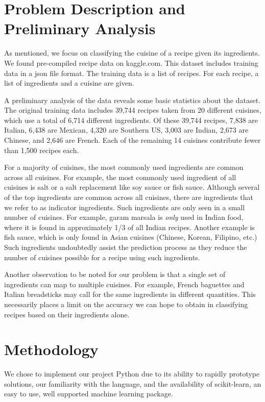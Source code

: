 \documentclass[11pt]{article}
\begin{document}
\section{Problem Description and Preliminary Analysis}
As mentioned, we focus on classifying the cuisine of a recipe given
its ingredients.  We found pre-compiled recipe data on kaggle.com.
This dataset includes training data in a json file format.  The
training data is a list of recipes.  For each recipe, a list of
ingredients and a cuisine are given.  

A preliminary analysis of the data reveals some basic statistics about
the dataset.  The original training data includes 39,744 recipes taken
from 20 different cuisines, which use a total of 6,714 different
ingredients.  Of these 39,744 recipes, 7,838 are Italian, 6,438 are
Mexican, 4,320 are Southern US, 3,003 are Indian, 2,673 are Chinese,
and 2,646 are French.  Each of the remaining 14 cuisines contribute
fewer than 1,500 recipes each.

For a majority of cuisines, the most commonly used ingredients are
common across all cuisines.  For example, the most commonly used
ingredient of all cuisines is salt or a salt replacement like soy
sauce or fish sauce.  Although several of the top ingredients are
common across all cuisines, there are ingredients that we refer to as
indicator ingredients.  Such ingredients are only seen in a small
number of cuisines.  For example, garam marsala is \emph{only} used in
Indian food, where it is found in approximately 1/3 of all Indian
recipes.  Another example is fish sauce, which is only found in Asian
cuisines (Chinese, Korean, Filipino, etc.) Such ingredients
undoubtedly assist the prediction process as they reduce 
the number of cuisines possible for a recipe using such ingredients.  

Another observation to be noted for our problem is that a single set of
ingredients can map to multiple cuisines.  For example, French
baguettes and Italian breadsticks may call for the same ingredients in
different quantities.  This necessarily places a limit on the accuracy
we can hope to obtain in classifying recipes based on their
ingredients alone.


\section{Methodology}
We chose to implement our project Python due to its ability to rapidly
prototype solutions, our familiarity with the language, and the
availability of scikit-learn\cite{scikit}, an easy to use, well supported machine
learning package.  
\end{document}
